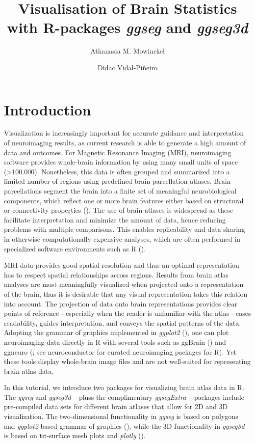 \documentclass[fleqn,10pt]{wlpeerj} %
\title{Visualisation of Brain Statistics with R-packages \emph{ggseg} and \emph{ggseg3d}}
\author[1]{Athanasia M. Mowinckel}
\author[1]{Didac Vidal-Piñeiro}
\affil[1]{Center for Lifespan Changes in Brain and Cognition, University of Oslo, PO. box 1094 Blindern, 0317 Oslo, Norway}
\begin{document}
\flushbottom
\maketitle
\thispagestyle{empty}

\hypertarget{introduction}{%
\section{Introduction}\label{introduction}}

Visualization is increasingly important for accurate guidance and interpretation of neuroimaging results, as current research is able to generate a high amount of data and outcomes.
For Magnetic Resonance Imaging (MRI), neuroimaging software provides whole-brain information by using many small units of space (\textgreater100.000).
Nonetheless, this data is often grouped and summarized into a limited number of regions using predefined brain parcellation atlases.
Brain parcellations segment the brain into a finite set of meaningful neurobiological components, which reflect one or more brain features either based on structural or connectivity properties (\citet{eickhoff_2018}).
The use of brain atlases is widespread as these facilitate interpretation and minimize the amount of data, hence reducing problems with multiple comparisons.
This enables replicability and data sharing in otherwise computationally expensive analyses, which are often performed in specialized software environments such as R (\citet{R}).

MRI data provides good spatial resolution and thus an optimal representation has to respect spatial relationships across regions.
Results from brain atlas analyses are most meaningfully visualized when projected onto a representation of the brain, thus it is desirable that any visual representation takes this relation into account.
The projection of data onto brain representations provides clear points of reference - especially when the reader is unfamiliar with the atlas - eases readability, guides interpretation, and conveys the spatial patterns of the data.
Adopting the grammar of graphics implemented in \emph{ggplot2} (\citet{ggplot}), one can plot neuroimaging data directly in R with several tools such as ggBrain (\citet{ggBrain}) and ggneuro (\citet{ggneuro}; see neuroconductor \citeyearpar{neuroconductor} for curated neuroimaging packages for R).
Yet these tools display whole-brain image files and are not well-suited for representing brain atlas data.

In this tutorial, we introduce two packages for visualizing brain atlas data in R.
The \emph{ggseg} and \emph{ggseg3d} -- pluss the complimentary \emph{ggsegExtra} -- packages include pre-compiled data sets for different brain atlases that allow for 2D and 3D visualization.
The two-dimensional functionality in \emph{ggseg} is based on polygons and \emph{ggplot2}-based grammar of graphics (\citet{ggplot}), while the 3D functionality in \emph{ggseg3d} is based on tri-surface mesh plots and \emph{plotly} (\citet{plotly}).
\end{document}
